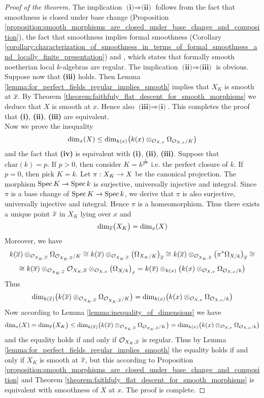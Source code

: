 \begin{proof}[Proof of the theorem]
The implication $\textbf{(i)}\Rightarrow \textbf{(ii)}$ follows from the fact that smoothness is closed under base change (Proposition \ref{proposition:smooth_morphisms_are_closed_under_base_change_and_composition}), the fact that smoothness implies formal smoothness (Corollary \ref{corollary:characterization_of_smoothness_in_terms_of_formal_smoothness_and_locally_finite_presentation}) and {\cite[Theorem 6.3]{Formally_smooth_and_unramified}}, which states that formally smooth noetherian local $k$-algebras are regular. The implication $\textbf{(ii)}\Rightarrow \textbf{(iii)}$ is obvious. Suppose now that \textbf{(iii)} holds. Then Lemma \ref{lemma:for_perfect_fields_regular_implies_smooth} implies that $X_K$ is smooth at $\overline{x}$. By Theorem \ref{theorem:faithfuly_flat_descent_for_smooth_morphisms} we deduce that $X$ is smooth at $x$. Hence also $\textbf{(iii)}\Rightarrow \textbf{(i)}$. This completes the proof that \textbf{(i)}, \textbf{(ii)}, \textbf{(iii)} are equivalent.\\
Now we prove the inequality
$$\mathrm{dim}_x(X) \leq \mathrm{dim}_{k(x)}\big(k(x)\otimes_{{\mathcal O}_{X,x}}\Omega_{{\mathcal O}_{X,x}/K}\big)$$
and the fact that \textbf{(iv)} is equivalent with \textbf{(i)}, \textbf{(ii)}, \textbf{(iii)}. Suppose that $\mathrm{char}(k) = p$. If $p>0$, then consider $K = k^{\frac{1}{p^{\infty}}}$ i.e. the perfect closure of $k$. If $p = 0$, then pick $K = k$. Let $\pi:X_K\rightarrow X$ be the canonical projection. The morphism $\mathrm{Spec}\, K \rightarrow \mathrm{Spec}\, k$ is surjective, universally injective and integral. Since $\pi$ is a base change of $\mathrm{Spec}\, K\rightarrow \mathrm{Spec}\, k$, we derive that $\pi$ is also surjective, universally injective and integral. Hence $\pi$ is a homeomorphism. Thus there exists a unique point $\overline{x}$ in $X_K$ lying over $x$ and
$$\mathrm{dim}_{\overline{x}}\big(X_K\big) = \mathrm{dim}_x(X)$$
Moreover, we have
$$k(\overline{x})\otimes_{{\mathcal O}_{X_K,\overline{x}}}\Omega_{{\mathcal O}_{X_K,\overline{x}}/K} \cong k(\overline{x})\otimes_{{\mathcal O}_{X_K,\overline{x}}}\big(\Omega_{X_K/K}\big)_{\overline{x}} \cong k(\overline{x})\otimes_{{\mathcal O}_{X_K,\overline{x}}}\big(\pi^*\Omega_{X/k}\big)_{\overline{x}} \cong$$
$$\cong k(\overline{x})\otimes_{{\mathcal O}_{X_K,\overline{x}}} {\mathcal O}_{X_K,\overline{x}}\otimes_{{\mathcal O}_{X,x}}\big(\Omega_{X/k}\big)_x = k(\overline{x})\otimes_{k(x)}\big(k(x)\otimes_{{\mathcal O}_{X,x}}\Omega_{{\mathcal O}_{X,x}/k}\big)$$
Thus
$$\mathrm{dim}_{k(\overline{x})}\big(k(\overline{x})\otimes_{{\mathcal O}_{X_K,\overline{x}}}\Omega_{{\mathcal O}_{X_K,\overline{x}}/K}\big) = \mathrm{dim}_{k(x)}\big(k(x)\otimes_{{\mathcal O}_{X,x}}\Omega_{{\mathcal O}_{X,x}/k}\big)$$
Now according to Lemma \ref{lemma:inequality_of_dimensions} we have
$$ \mathrm{dim}_x(X) = \mathrm{dim}_{\overline{x}}\big(X_K\big) \leq \mathrm{dim}_{k(\overline{x})}\big(k(\overline{x})\otimes_{{\mathcal O}_{X_K,\overline{x}}}\Omega_{{\mathcal O}_{X_K,\overline{x}}/K}\big) = \mathrm{dim}_{k(x)}\big(k(x)\otimes_{{\mathcal O}_{X,x}}\Omega_{{\mathcal O}_{X,x}/k}\big)$$
and the equality holds if and only if ${\mathcal O}_{X_K,\overline{x}}$ is regular. Thus by Lemma \ref{lemma:for_perfect_fields_regular_implies_smooth} the equality holds if and only if $X_K$ is smooth at $\overline{x}$, but this according to  Proposition \ref{proposition:smooth_morphisms_are_closed_under_base_change_and_composition} and Theorem \ref{theorem:faithfuly_flat_descent_for_smooth_morphisms} is equivalent with smoothness of $X$ at $x$. The proof is complete.
\end{proof}

